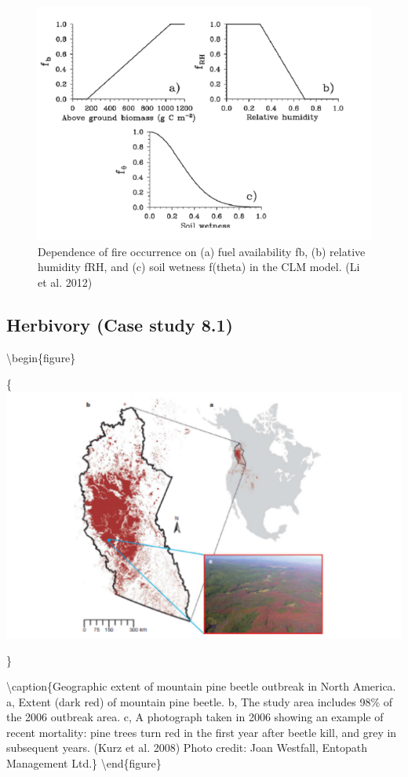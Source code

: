 \documentclass[12pt,oneside]{book}
\begin{document}
\begin{figure}

{\centering \includegraphics[width=0.8\linewidth]{figures/chap8/f89_CLM_fire_relations} 

}

\caption{Dependence of fire occurrence on (a) fuel availability fb, (b) relative humidity fRH, and (c) soil wetness f(theta) in the CLM model. (Li et al. 2012)}\label{fig:f89}
\end{figure}

\subsection{Herbivory (Case study 8.1)}\label{herbivory-case-study-8.1}

\textbackslash{}begin\{figure\}

\{\centering \includegraphics[width=0.8\linewidth]{figures/chap8/f810_Kurz1}

\}

\textbackslash{}caption\{Geographic extent of mountain pine beetle
outbreak in North America. a, Extent (dark red) of mountain pine beetle.
b, The study area includes 98\% of the 2006 outbreak area. c, A
photograph taken in 2006 showing an example of recent mortality: pine
trees turn red in the first year after beetle kill, and grey in
subsequent years. (Kurz et al. 2008) Photo credit: Joan Westfall,
Entopath Management Ltd.\}\label{fig:f810} \textbackslash{}end\{figure\}
\end{document}
